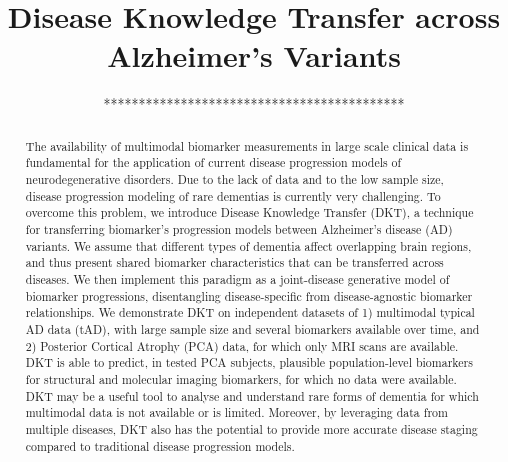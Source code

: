 \documentclass{llncs}
\begin{document}

\title{Disease Knowledge Transfer across Alzheimer's Variants}
%
%

% 
% 

\author{*******************************************}

\institute{***************************************}


\maketitle              %

\begin{abstract}
The availability of multimodal biomarker measurements in large scale clinical data is fundamental for the application of current disease progression models of neurodegenerative disorders. Due to the lack of data and to the low sample size, disease progression modeling of rare dementias is currently very challenging. To overcome this problem, we introduce Disease Knowledge Transfer (DKT), a technique for transferring biomarker's progression models between Alzheimer's disease (AD) variants. We assume that different types of dementia affect overlapping brain regions, and thus present shared biomarker characteristics that can be transferred across diseases. We then implement this paradigm as a joint-disease generative model of biomarker progressions, disentangling disease-specific from  disease-agnostic biomarker relationships. We demonstrate DKT on independent datasets of 1) multimodal typical AD data (tAD), with large sample size and several biomarkers available over time, and 2) Posterior Cortical Atrophy (PCA) data, for which only MRI scans are available. DKT is able to predict, in tested PCA subjects, plausible population-level biomarkers for structural and molecular imaging biomarkers, for which no data were available. DKT may be a useful tool to analyse and understand rare forms of dementia for which multimodal data is not available or is limited. Moreover, by leveraging data from multiple diseases, DKT also has the potential to provide more accurate disease staging compared to traditional disease progression models.


\end{abstract}
\end{document}

